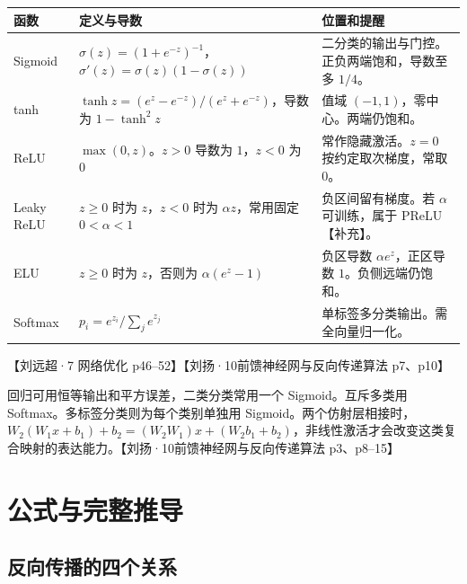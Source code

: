\documentclass[UTF8,a4paper,zihao=-4,fontset=fandol]{ctexrep}
\begin{document}
\begin{center}
\begin{tabularx}{\linewidth}{@{}lXX@{}}
\toprule
函数 & 定义与导数 & 位置和提醒\\
\midrule
Sigmoid & $\sigma(z)=(1+e^{-z})^{-1}$，$\sigma'(z)=\sigma(z)(1-\sigma(z))$ & 二分类的输出与门控。正负两端饱和，导数至多 $1/4$。\\
tanh & $\tanh z=(e^z-e^{-z})/(e^z+e^{-z})$，导数为 $1-\tanh^2 z$ & 值域 $(-1,1)$，零中心。两端仍饱和。\\
ReLU & $\max(0,z)$。$z>0$ 导数为 $1$，$z<0$ 为 $0$ & 常作隐藏激活。$z=0$ 按约定取次梯度，常取 $0$。\\
Leaky ReLU & $z\ge0$ 时为 $z$，$z<0$ 时为 $\alpha z$，常用固定 $0<\alpha<1$ & 负区间留有梯度。若 $\alpha$ 可训练，属于 PReLU【补充】。\\
ELU & $z\ge 0$ 时为 $z$，否则为 $\alpha(e^z-1)$ & 负区导数 $\alpha e^z$，正区导数 $1$。负侧远端仍饱和。\\
Softmax & $p_i=e^{z_i}/\sum_j e^{z_j}$ & 单标签多分类输出。需全向量归一化。\\
\bottomrule
\end{tabularx}
\end{center}
【刘远超·7 网络优化 p46--52】【刘扬·10前馈神经网与反向传递算法 p7、p10】

回归可用恒等输出和平方误差，二类分类常用一个 Sigmoid。互斥多类用 Softmax。多标签分类则为每个类别单独用 Sigmoid。两个仿射层相接时，$W_2(W_1x+b_1)+b_2=(W_2W_1)x+(W_2b_1+b_2)$，非线性激活才会改变这类复合映射的表达能力。【刘扬·10前馈神经网与反向传递算法 p3、p8--15】

\section{公式与完整推导}

\subsection*{反向传播的四个关系}
\end{document}
